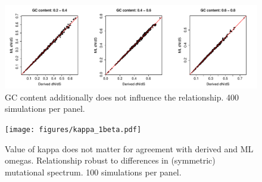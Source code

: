 \documentclass[11pt]{article}
\begin{document}


	
\newpage

	


\bigskip

\begin{figure}[H]
\centerline{\includegraphics[width=6in]{figures/gc_2beta.pdf}}
\caption{\label{gc} GC content additionally does not influence the relationship. 400 simulations per panel.}
\end{figure}

\begin{figure}[H]
\centerline{\texttt{[image: figures/kappa\_1beta.pdf]}}
\caption{\label{kappa} Value of kappa does not matter for agreement with derived and ML omegas. Relationship robust to differences in (symmetric) mutational spectrum. 100 simulations per panel.}
\end{figure}
\end{document}
